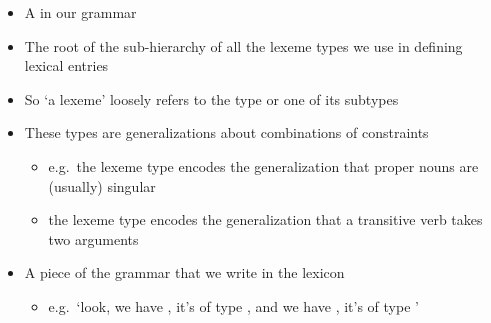 \documentclass[a4paper,landscape,headrule,footrule]{foils}
\begin{document}
\begin{itemize}
\item A  in our grammar
\item The root of the sub-hierarchy of all the lexeme types we use in
  defining lexical entries
\item So `a lexeme' loosely refers to the type  or one of
  its subtypes
\item These types are generalizations about combinations of
  constraints
  \begin{itemize}
  \item e.g.\ the lexeme type  encodes the generalization
    that proper nouns are (usually) singular
  \item the lexeme type  encodes the generalization that
    a transitive verb takes two arguments
  \end{itemize}
\end{itemize}

\begin{itemize}
\item A piece of the grammar that we write in the lexicon
  \begin{itemize}
  \item e.g.\ `look, we have , it's of type ,
    and we have , it's of type '
  \end{itemize}
\end{itemize}
\begin{center}
\end{center}
\end{document}
